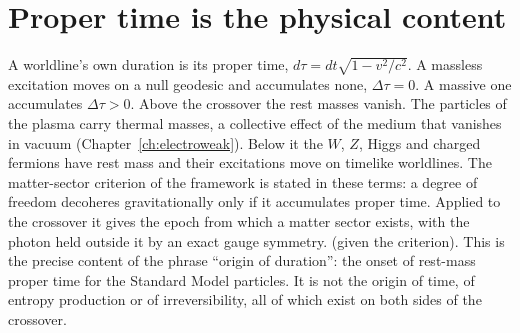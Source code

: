 \section{Proper time is the physical content}\label{sec:hr:proper}
A worldline's own duration is its proper time, $d\tau=dt\sqrt{1-v^2/c^2}$. A massless excitation moves on a null geodesic and accumulates none,
$\Delta\tau=0$. A massive one accumulates $\Delta\tau>0$. \derived{} Above the crossover the rest masses vanish. The particles of the plasma carry
thermal masses, a collective effect of the medium that vanishes in vacuum (Chapter~\ref{ch:electroweak}). Below it the $W$, $Z$, Higgs and charged
fermions have rest mass and their excitations move on timelike worldlines. \observed{} The matter-sector criterion of the framework is stated in
these terms: a degree of freedom decoheres gravitationally only if it accumulates proper time. Applied to the crossover it gives the epoch from
which a matter sector exists, with the photon held outside it by an exact gauge symmetry. \derived{} (given the criterion). This is the precise
content of the phrase ``origin of duration'': the onset of rest-mass proper time for the Standard Model particles. It is not the origin of time,
of entropy production or of irreversibility, all of which exist on both sides of the crossover.

